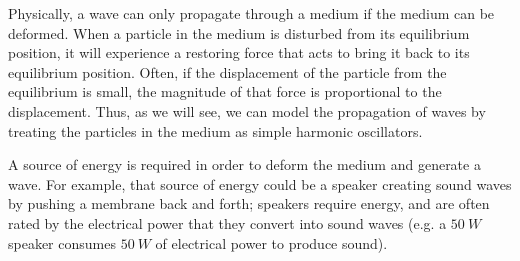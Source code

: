 Physically, a wave can only propagate through a medium if the medium can be deformed. When a particle in the medium is disturbed from its equilibrium position, it will experience a restoring force that acts to bring it back to its equilibrium position. Often, if the displacement of the particle from the equilibrium is small, the magnitude of that force is proportional to the displacement. Thus, as we will see, we can model the propagation of waves by treating the particles in the medium as simple harmonic oscillators.

A source of energy is required in order to deform the medium and generate a wave. For example, that source of energy could be a speaker creating sound waves by pushing a membrane back and forth; speakers require energy, and are often rated by the electrical power that they convert into sound waves (e.g. a $\SI{50}{W}$ speaker consumes $\SI{50}{W}$ of electrical power to produce sound).



